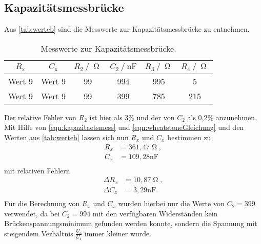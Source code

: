 \subsection{Kapazitätsmessbrücke}
Aus \autoref{tab:werteb} sind die Messwerte zur Kapazitätsmessbrücke zu entnehmen.
\begin{table}[H]
  \centering
  \caption{Messwerte zur Kapazitätsmessbrücke.}
  \label{tab:werteb}
  \begin{tabular}{c c c c c c}
    \toprule
    $R_{\text{x}}$ & $C_{\text{x}}$ & $R_{\text{2}} \:/\: \upOmega$ & $C_{\text{2}} \:/\: \si{\nano\farad}$ & $R_{\text{3}} \:/\: \upOmega$ & $R_{\text{4}} \:/\: \upOmega$ \\
    \midrule
    Wert 9 & Wert 9 & 99 & 994 & 995 & 5 \\
    Wert 9 & Wert 9 & 99 & 399 & 785 & 215 \\
    \bottomrule
  \end{tabular}
\end{table}
Der relative Fehler von $R_2$ ist hier als 3\% und der von $C_2$ als 0,2\% anzunehmen. Mit Hilfe von \autoref{eqn:kapazitaetsmess} und \autoref{eqn:wheatstoneGleichung} und den
Werten aus \autoref{tab:werteb} lassen sich nun $R_x$ und $C_x$ bestimmen zu
\begin{align*}
  R_x &= 361,47 \upOmega, \\
  C_x &= 109,28 \si{\nano\farad} \\
\end{align*}
mit relativen Fehlern
\begin{align*}
  \Delta R_x &= 10,87 \upOmega, \\
  \Delta C_x &= 3,29 \si{\nano\farad} . \\
\end{align*}
Für die Berechnung von $R_x$ und $C_x$ wurden hierbei nur die Werte von $C_{\text{2}} = 399$ verwendet, da bei $C_{\text{2}} = 994$ mit den verfügbaren Widerständen kein Brückenspannungsminimum
gefunden werden konnte, sondern die Spannung mit steigendem Verhältnis $\frac{U_3}{U_4}$ immer kleiner wurde.


